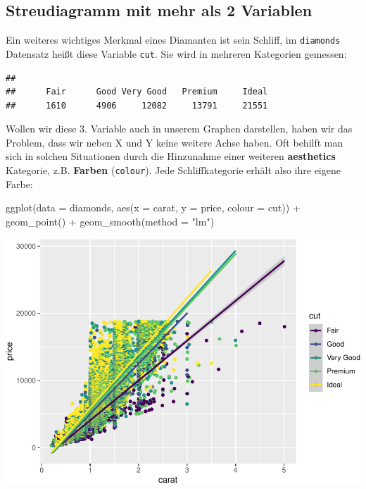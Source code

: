 \documentclass[
]{book}
\newenvironment{Shaded}{\begin{snugshade}}{\end{snugshade}}
\newcommand{\AttributeTok}[1]{\textcolor[rgb]{0.77,0.63,0.00}{#1}}
\newcommand{\FunctionTok}[1]{\textcolor[rgb]{0.00,0.00,0.00}{#1}}
\newcommand{\NormalTok}[1]{#1}
\newcommand{\SpecialCharTok}[1]{\textcolor[rgb]{0.00,0.00,0.00}{#1}}
\newcommand{\StringTok}[1]{\textcolor[rgb]{0.31,0.60,0.02}{#1}}
\begin{document}
\hypertarget{streudiagramm-mit-mehr-als-2-variablen}{%
\subsection{Streudiagramm mit mehr als 2 Variablen}\label{streudiagramm-mit-mehr-als-2-variablen}}

Ein weiteres wichtiges Merkmal eines Diamanten ist sein Schliff, im \texttt{diamonds} Datensatz heißt diese Variable \texttt{cut}. Sie wird in mehreren Kategorien gemessen:

\begin{Shaded}
\end{Shaded}

\begin{verbatim}
## 
##      Fair      Good Very Good   Premium     Ideal 
##      1610      4906     12082     13791     21551
\end{verbatim}

Wollen wir diese 3. Variable auch in unserem Graphen darstellen, haben wir das Problem, dass wir neben X und Y keine weitere Achse haben. Oft behilft man sich in solchen Situationen durch die Hinzunahme einer weiteren \textbf{aesthetics} Kategorie, z.B. \textbf{Farben} (\texttt{colour}). Jede Schliffkategorie erhält also ihre eigene Farbe:

\begin{Shaded}
\begin{Highlighting}[]
\FunctionTok{ggplot}\NormalTok{(}\AttributeTok{data =}\NormalTok{ diamonds, }\FunctionTok{aes}\NormalTok{(}\AttributeTok{x =}\NormalTok{ carat, }\AttributeTok{y =}\NormalTok{ price, }\AttributeTok{colour =}\NormalTok{ cut)) }\SpecialCharTok{+}
  \FunctionTok{geom\_point}\NormalTok{() }\SpecialCharTok{+}
  \FunctionTok{geom\_smooth}\NormalTok{(}\AttributeTok{method =} \StringTok{"lm"}\NormalTok{)}
\end{Highlighting}
\end{Shaded}

\includegraphics{CFH_R_bookdown_files/figure-latex/unnamed-chunk-159-1.pdf}
\end{document}
